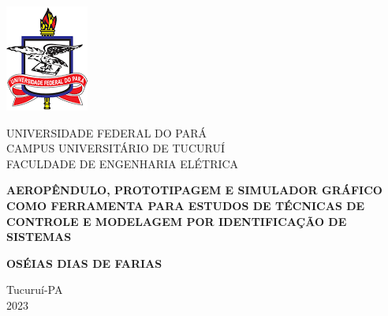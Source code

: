 	\thispagestyle{empty}
	\begin{center}

        \includegraphics[scale=0.5]{Figuras/logoufpa.png}
		
			UNIVERSIDADE FEDERAL DO PARÁ\\
			CAMPUS UNIVERSITÁRIO DE TUCURUÍ\\
			FACULDADE DE ENGENHARIA ELÉTRICA
			
			\vfill 
			
			\textbf{AEROPÊNDULO, PROTOTIPAGEM E SIMULADOR GRÁFICO COMO FERRAMENTA PARA ESTUDOS DE TÉCNICAS DE CONTROLE E MODELAGEM POR IDENTIFICAÇÃO DE SISTEMAS}
			
			\vfill
			
			\textbf{OSÉIAS DIAS DE FARIAS}
			
			\vfill \vfill
			
			Tucuruí-PA\\			
			2023
			
	\end{center}


